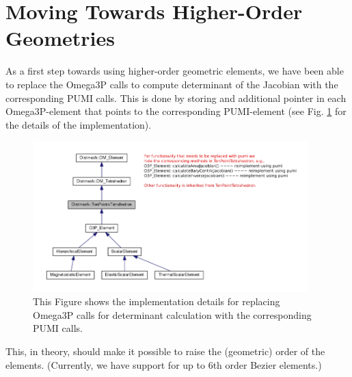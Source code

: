\documentclass[review,authoryear,12pt]{elsarticle_summary_report}
\begin{document}
\section{Moving Towards Higher-Order Geometries}
As a first step towards using higher-order geometric elements, we have been able to replace the Omega3P calls to compute determinant of the Jacobian with the corresponding PUMI calls. This is done by storing and additional pointer in each Omega3P-element that points to the corresponding  PUMI-element (see Fig. \ref{imp} for the details of the implementation). 
\begin{figure}[ph!]
\centering
\includegraphics[width=0.95\textwidth]{hide_ten_point_tet.png}
\caption{\label{imp} This Figure shows the implementation details for replacing Omega3P calls for determinant calculation with the corresponding PUMI calls.}
\end{figure}
This, in theory, should make it possible to raise the (geometric) order of the elements. (Currently, we have support for up to 6th order Bezier elements.)

% 
%  
\end{document}

